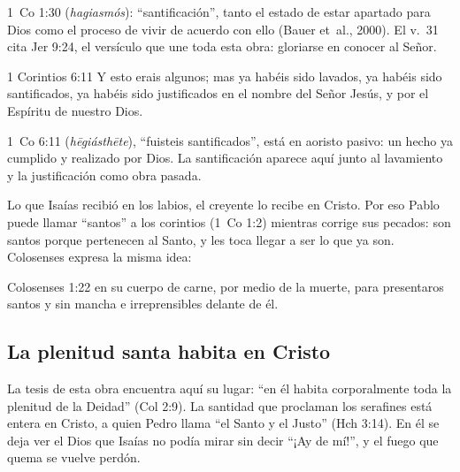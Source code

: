 \begin{filologiatexto}{1~Co 1:30}
 (\emph{hagiasmós}): ``santificación'', tanto el estado de estar apartado para Dios como el proceso de vivir de acuerdo con ello (Bauer et~al., 2000). El v.~31 cita Jer 9:24, el versículo que une toda esta obra: gloriarse en conocer al Señor.
\end{filologiatexto}

\begin{verso}{1 Corintios 6:11}
Y esto erais algunos; mas ya habéis sido lavados, ya habéis sido santificados, ya habéis sido justificados en el nombre del Señor Jesús, y por el Espíritu de nuestro Dios.
\end{verso}

\begin{filologiatexto}{1~Co 6:11}
 (\emph{hēgiásthēte}), ``fuisteis santificados'', está en aoristo pasivo: un hecho ya cumplido y realizado por Dios. La santificación aparece aquí junto al lavamiento y la justificación como obra pasada.
\end{filologiatexto}

Lo que Isaías recibió en los labios, el creyente lo recibe en Cristo. Por eso Pablo puede llamar ``santos'' a los corintios (1~Co 1:2) mientras corrige sus pecados: son santos porque pertenecen al Santo, y les toca llegar a ser lo que ya son. Colosenses expresa la misma idea:

\begin{verso}{Colosenses 1:22}
en su cuerpo de carne, por medio de la muerte, para presentaros santos y sin mancha e irreprensibles delante de él.
\end{verso}


\subsection{La plenitud santa habita en Cristo}
La tesis de esta obra encuentra aquí su lugar: ``en él habita corporalmente toda la plenitud de la Deidad'' (Col 2:9). La santidad que proclaman los serafines está entera en Cristo, a quien Pedro llama ``el Santo y el Justo'' (Hch 3:14). En él se deja ver el Dios que Isaías no podía mirar sin decir ``¡Ay de mí!'', y el fuego que quema se vuelve perdón.

